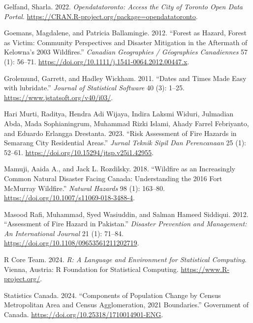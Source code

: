 \documentclass[
  letterpaper,
  DIV=11,
  numbers=noendperiod]{scrartcl}
\newlength{\cslhangindent}
\newenvironment{CSLReferences}[2] %
 {\begin{list}{}{%
  \setlength{\itemindent}{0pt}
  \setlength{\leftmargin}{0pt}
  \setlength{\parsep}{0pt}
  \ifodd #1
   \setlength{\leftmargin}{\cslhangindent}
   \setlength{\itemindent}{-1\cslhangindent}
  \fi
  \setlength{\itemsep}{#2\baselineskip}}}
 {\end{list}}
\begin{document}
\label{refs}
\begin{CSLReferences}{1}{0}
Gelfand, Sharla. 2022. \emph{Opendatatoronto: Access the City of Toronto
Open Data Portal}.
\url{https://CRAN.R-project.org/package=opendatatoronto}.

Goemans, Magdalene, and Patricia Ballamingie. 2012. {``Forest as Hazard,
Forest as Victim: Community Perspectives and Disaster Mitigation in the
Aftermath of Kelowna's 2003 Wildfires.''} \emph{Canadian Geographies /
Géographies Canadiennes} 57 (1): 56--71.
\url{https://doi.org/10.1111/j.1541-0064.2012.00447.x}.

Grolemund, Garrett, and Hadley Wickham. 2011. {``Dates and Times Made
Easy with {lubridate}.''} \emph{Journal of Statistical Software} 40 (3):
1--25. \url{https://www.jstatsoft.org/v40/i03/}.

Hari Murti, Raditya, Hendra Adi Wijaya, Indira Laksmi Widuri, Julmadian
Abda, Mada Sophianingrum, Muhammad Rizki Islami, Ahady Farrel
Febriyanto, and Eduardo Erlangga Drestanta. 2023. {``Risk Assessment of
Fire Hazards in Semarang City Residential Areas.''} \emph{Jurnal Teknik
Sipil Dan Perencanaan} 25 (1): 52--61.
\url{https://doi.org/10.15294/jtsp.v25i1.42955}.

Mamuji, Aaida A., and Jack L. Rozdilsky. 2018. {``Wildfire as an
Increasingly Common Natural Disaster Facing Canada: Understanding the
2016 Fort McMurray Wildfire.''} \emph{Natural Hazards} 98 (1): 163--80.
\url{https://doi.org/10.1007/s11069-018-3488-4}.

Masood Rafi, Muhammad, Syed Wasiuddin, and Salman Hameed Siddiqui. 2012.
{``Assessment of Fire Hazard in Pakistan.''} \emph{Disaster Prevention
and Management: An International Journal} 21 (1): 71--84.
\url{https://doi.org/10.1108/09653561211202719}.

R Core Team. 2024. \emph{R: A Language and Environment for Statistical
Computing}. Vienna, Austria: R Foundation for Statistical Computing.
\url{https://www.R-project.org/}.

Statistics Canada. 2024. {``Components of Population Change by Census
Metropolitan Area and Census Agglomeration, 2021 Boundaries.''}
Government of Canada. \url{https://doi.org/10.25318/1710014901-ENG}.


\end{CSLReferences}
\end{document}
